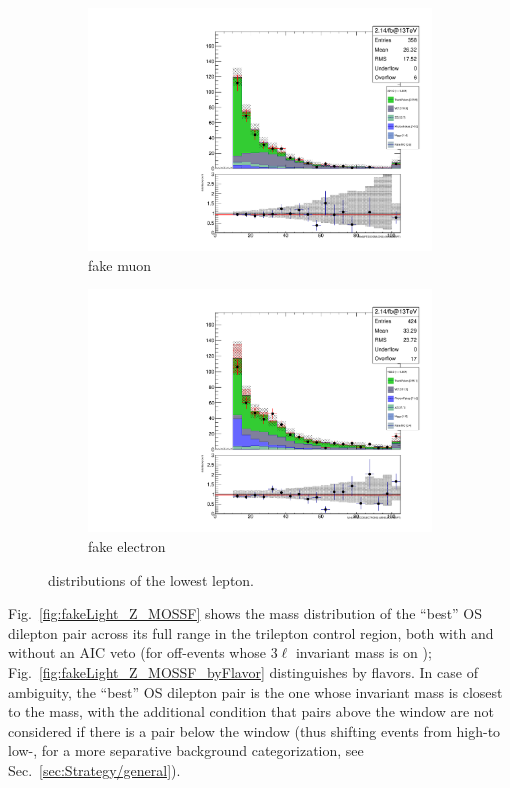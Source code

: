 \begin{figure}
\begin{center}
	\begin{subfigure}[b]{.7\textwidth}
		\includegraphics[width=\textwidth]{Background/bkg_fakeLight/Z_muFake_MINMUONPT}
		\caption{fake muon}
	\end{subfigure}
	\begin{subfigure}[b]{.7\textwidth}
		\includegraphics[width=\textwidth]{Background/bkg_fakeLight/Z_elFake_MINELECTRONPT}
		\caption{fake electron}
	\end{subfigure}
	\caption{\pt distributions of the lowest \pt lepton.
	\label{fig:fakeLight_Z_MINleptonPT}}
\end{center}
\end{figure}

Fig.~\ref{fig:fakeLight_Z_MOSSF} shows the mass distribution of the ``best'' OS dilepton pair across its full range in the trilepton control region, both with and without an AIC veto (for off-\Z events whose 3$\ell$ invariant mass is on \Z); Fig.~\ref{fig:fakeLight_Z_MOSSF_byFlavor} distinguishes by flavors. In case of ambiguity, the ``best'' OS dilepton pair is the one whose invariant mass is closest to the \Z mass, with the additional condition that pairs above the \Z window are not considered if there is a pair below the \Z window (thus shifting events from high-\Z to low-\Z, for a more separative background categorization, see Sec.~\ref{sec:Strategy/general}).

